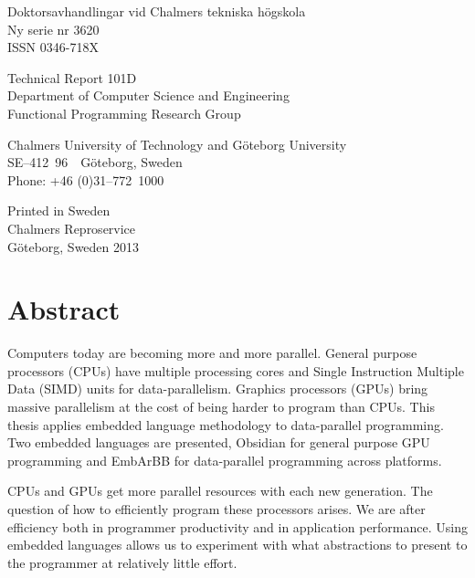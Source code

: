 \documentclass[a4paper]{book}
\newcommand{\dept}{Department of Computer Science and Engineering}
\newcommand{\uni}{Chalmers University of Technology and G\"oteborg University}
\newcommand{\group}{Functional Programming Research Group}
\begin{document}
\noindent Doktorsavhandlingar vid Chalmers tekniska högskola \\
\noindent Ny serie nr 3620 \\
\noindent ISSN 0346-718X \\

\vspace{1cm}

\noindent Technical Report 101D\\
\noindent \dept \\
\noindent \group\\

\vspace{1cm} 

\noindent \uni \\
\noindent SE--412~96~~G\"oteborg, Sweden\\
\noindent Phone: +46 (0)31--772~1000 \\

\vspace{1cm} 

\noindent Printed in Sweden\\
\noindent Chalmers Reproservice\\
\noindent G\"oteborg, Sweden 2013


\thispagestyle{empty}

\clearpage
{}

\section*{Abstract}

Computers today are becoming more and more parallel. General purpose processors (CPUs) 
have multiple processing cores and Single Instruction Multiple Data (SIMD) units for 
data-parallelism. Graphics processors (GPUs) bring massive parallelism at the cost of 
being harder to program than CPUs. This thesis applies embedded language methodology 
to data-parallel programming. Two embedded languages are presented, Obsidian for general 
purpose GPU programming and EmbArBB for data-parallel programming across platforms. 

CPUs and GPUs get more parallel resources with each new generation. The question of how to 
efficiently program these processors arises. We are after efficiency both in programmer 
productivity and in application performance. Using embedded languages allows us to experiment
with what abstractions to present to the programmer at relatively little effort.
\end{document}
